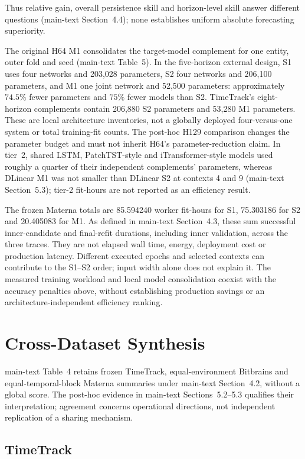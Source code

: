 \documentclass[a4paper,11pt]{article}
\begin{document}
Thus relative gain, overall persistence skill and horizon-level skill answer
different questions (main-text Section~4.4); none establishes uniform
absolute forecasting superiority.

The original H64 M1 consolidates the target-model complement for one entity,
outer fold and seed (main-text Table~5). In the five-horizon external design, S1 uses four
networks and 203,028 parameters, S2 four networks and 206,100 parameters, and
M1 one joint network and 52,500 parameters: approximately $74.5\%$ fewer
parameters and $75\%$ fewer models than S2. TimeTrack's eight-horizon
complements contain 206,880 S2 parameters and 53,280 M1 parameters. These
are local architecture inventories, not a globally deployed four-versus-one
system or total training-fit counts. The post-hoc H129 comparison changes
the parameter budget and must not inherit H64's parameter-reduction claim.
In tier~2, shared LSTM, PatchTST-style and iTransformer-style models used
roughly a quarter of their independent complements' parameters, whereas
DLinear M1 was not smaller than DLinear S2 at contexts 4 and 9
(main-text Section~5.3); tier-2 fit-hours are not reported as an
efficiency result.


The frozen Materna totals are 85.594240 worker fit-hours for S1, 75.303186 for
S2 and 20.405083 for M1. As defined in main-text Section~4.3,
these sum successful inner-candidate and final-refit durations, including
inner validation, across the three traces. They are not elapsed wall time,
energy, deployment cost or production latency. Different executed epochs and
selected contexts can contribute to the S1--S2 order; input width alone does
not explain it. The measured training workload and local model consolidation
coexist with the accuracy penalties above, without establishing production
savings or an architecture-independent efficiency ranking.

\section*{Cross-Dataset Synthesis}


main-text Table~4 retains frozen TimeTrack,
equal-environment Bitbrains and equal-temporal-block Materna summaries under
main-text Section~4.2, without a global score.
The post-hoc evidence in main-text Sections~5.2--5.3
qualifies their interpretation; agreement concerns operational directions,
not independent replication of a sharing mechanism.

\subsection*{TimeTrack}
\end{document}
